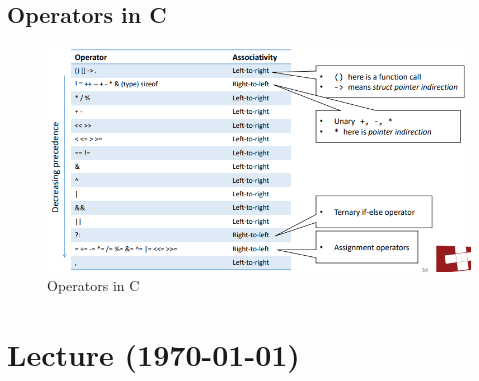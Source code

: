 \documentclass[a4paper,10pt]{article}
\begin{document}
\subsection{Operators in C}
\begin{figure}[h]
    \centering
    \includegraphics[width=1\linewidth]{Pictures/e13.png}
    \caption{Operators in C}
    \label{fig:enter-label}
\end{figure}
\section{Lecture (\today)}
\end{document}
